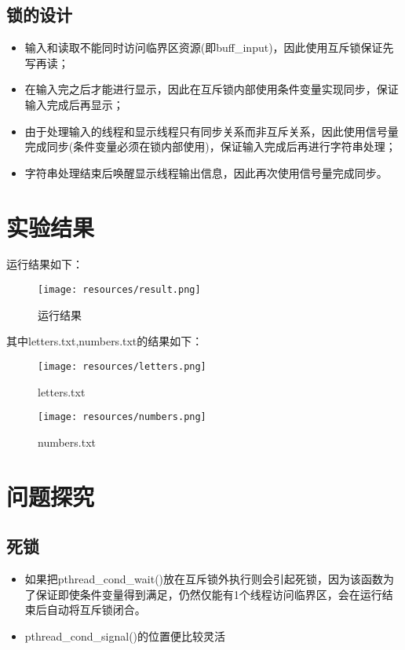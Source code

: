 \documentclass[UTF8]{ctexart}
\begin{document}
    \subsection{锁的设计}
    \begin{itemize}
        \item 输入和读取不能同时访问临界区资源(即buff\_input)，因此使用互斥锁保证先写再读；
        \item 在输入完之后才能进行显示，因此在互斥锁内部使用条件变量实现同步，保证输入完成后再显示；
        \item 由于处理输入的线程和显示线程只有同步关系而非互斥关系，因此使用信号量完成同步(条件变量必须在锁内部使用)，保证输入完成后再进行字符串处理；
        \item 字符串处理结束后唤醒显示线程输出信息，因此再次使用信号量完成同步。
    \end{itemize}
    \section{实验结果}
        运行结果如下：
        \begin{figure}[htb]
            \centering
            \texttt{[image: resources/result.png]}
            \caption{运行结果}
            \label{}
        \end{figure}
        其中letters.txt,numbers.txt的结果如下：
        \begin{figure}[htb]
            \centering
            \texttt{[image: resources/letters.png]}
            \caption{letters.txt}
            \label{}
        \end{figure}
        \begin{figure}[htb]
            \centering
            \texttt{[image: resources/numbers.png]}
            \caption{numbers.txt}
            \label{}
        \end{figure}
        \section{问题探究}
        \subsection{死锁}
        \begin{itemize}
            \item 如果把pthread\_cond\_wait()放在互斥锁外执行则会引起死锁，因为该函数为了保证即使条件变量得到满足，仍然仅能有1个线程访问临界区，会在运行结束后自动将互斥锁闭合。\par
            \item pthread\_cond\_signal()的位置便比较灵活
        \end{itemize}
        
\end{document}
